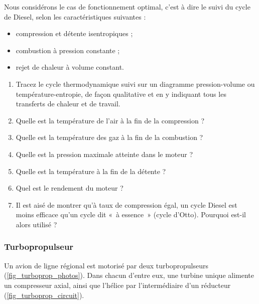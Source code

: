 \begin{figure}
\begin{center}
		\end{center}
		\label{fig_photos_moteur_diesel}
	\end{figure}

	Nous considérons le cas de fonctionnement optimal, c’est à dire le suivi du cycle de Diesel, selon les caractéristiques suivantes :
	\begin{itemize}
		\item compression et détente isentropiques ;
		\item combustion à pression constante ;
		\item rejet de chaleur à volume constant.
	\end{itemize}
	
	\begin{enumerate}
		\item Tracez le cycle thermodynamique suivi sur un diagramme pression-volume ou température-entropie, de façon qualitative et en y indiquant tous les transferts de chaleur et de travail.
		\item Quelle est la température de l’air à la fin de la compression ?
		\item Quelle est la température des gaz à la fin de la combustion ?
		\item Quelle est la pression maximale atteinte dans le moteur ?
		\item Quelle est la température à la fin de la détente ?
		\item Quel est le rendement du moteur ?
		\item Il est aisé de montrer qu’à taux de compression égal, un cycle Diesel est moins efficace qu’un cycle dit «~à essence~» (cycle d’Otto). Pourquoi est-il alors utilisé ?
	\end{enumerate}


\subsubsection{Turbopropulseur}
\label{exo_cycle_turbopropulseur}
	
	Un avion de ligne régional est motorisé par deux turbopropulseurs (\cref{fig_turboprop_photos}). Dans chacun d’entre eux, une turbine unique alimente un compresseur axial, ainsi que l’hélice par l’intermédiaire d’un réducteur (\cref{fig_turboprop_circuit}).
	
